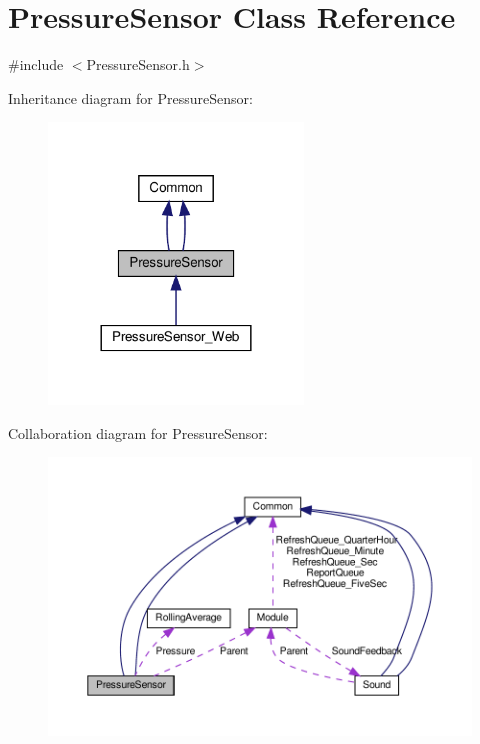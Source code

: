 \hypertarget{class_pressure_sensor}{}\section{Pressure\+Sensor Class Reference}
\label{class_pressure_sensor}


{\ttfamily \#include $<$Pressure\+Sensor.\+h$>$}



Inheritance diagram for Pressure\+Sensor\+:
\nopagebreak
\begin{figure}[H]
\begin{center}
\leavevmode
\includegraphics[width=192pt]{class_pressure_sensor__inherit__graph}
\end{center}
\end{figure}


Collaboration diagram for Pressure\+Sensor\+:
\nopagebreak
\begin{figure}[H]
\begin{center}
\leavevmode
\includegraphics[width=350pt]{class_pressure_sensor__coll__graph}
\end{center}
\end{figure}

